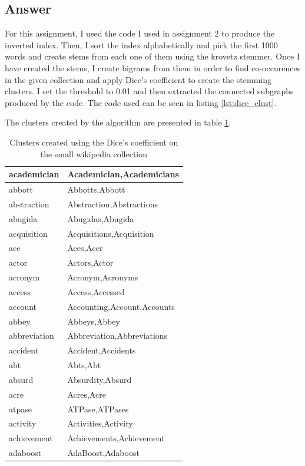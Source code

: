 \documentclass{article}
\begin{document}
	\subsection*{Answer}
	For this assignment, I used the code I used in assignment 2 to produce the inverted index. Then, I sort the index alphabetically and pick the first 1000 words and create stems from each one of them using the krovetz stemmer. Once I have created the stems, I create bigrams from them in order to find co-occurences in the given collection and apply Dice's coefficient to create the stemming clusters. I set the threshold to 0.01 and then extracted the connected subgraphs produced by the code. The code used can be seen in listing \ref{lst:dice_clust}.
	
	The clusters created by the algorithm are presented in table \ref{tb:dice_clusters}.
	\begin{table}[h]
	\centering
	\caption{Clusters created using the Dice's coefficient on the small wikipedia collection}
	\label{tb:dice_clusters}
	\begin{tabular}{|l|l|}
	\hline
	academician  & Academician,Academicians    \\ \hline
	abbott       & Abbotts,Abbott              \\ \hline
	abstraction  & Abstraction,Abstractions    \\ \hline
	abugida      & Abugidas,Abugida            \\ \hline
	acquisition  & Acquisitions,Acquisition    \\ \hline
	ace          & Aces,Acer                   \\ \hline
	actor        & Actors,Actor                \\ \hline
	acronym      & Acronym,Acronyms            \\ \hline
	access       & Access,Accessed             \\ \hline
	account      & Accounting,Account,Accounts \\ \hline
	abbey        & Abbeys,Abbey                \\ \hline
	abbreviation & Abbreviation,Abbreviations  \\ \hline
	accident     & Accident,Accidents          \\ \hline
	abt          & Abts,Abt                    \\ \hline
	absurd       & Absurdity,Absurd            \\ \hline
	acre         & Acres,Acre                  \\ \hline
	atpase       & ATPase,ATPases              \\ \hline
	activity     & Activities,Activity         \\ \hline
	achievement  & Achievements,Achievement    \\ \hline
	adaboost     & AdaBoost,Adaboost           \\ \hline
	\end{tabular}
	\end{table}
\end{document}
